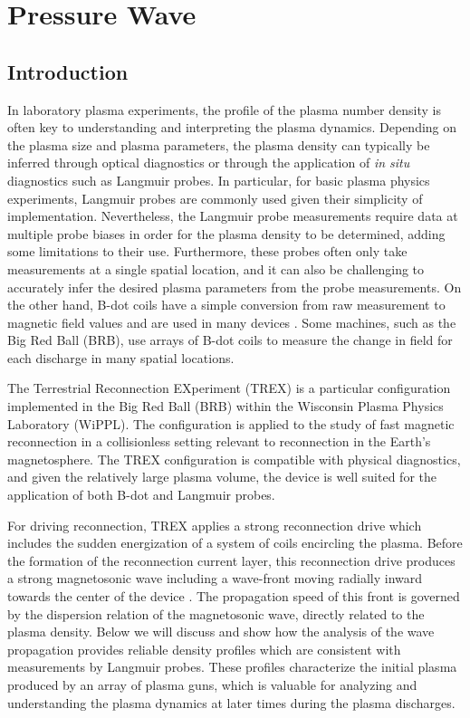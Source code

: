 \chapter{Pressure Wave}
\label{sch:pressure_wave}

\section{Introduction}

In laboratory plasma experiments, the profile of the plasma number density is often key to understanding and interpreting the plasma dynamics. Depending on the plasma size and plasma parameters, the plasma density  can typically be inferred through optical diagnostics or through the application of \textit{in situ} diagnostics such as Langmuir probes. In particular, for basic plasma physics experiments, Langmuir probes are commonly used given their simplicity of implementation. Nevertheless, the Langmuir probe measurements require data at multiple probe biases in order for the plasma density to be determined, adding some limitations to their use.  
Furthermore, these probes often only take measurements at a single spatial location, and it can also be challenging to accurately  infer the desired plasma parameters from the probe measurements.
On the other hand, B-dot coils have a simple  conversion from raw measurement to magnetic field values and are used in many devices \cite{Gekelman_Pribyl_Lucky_Drandell_Leneman_Maggs_Vincena_Van_Compernolle_Tripathi_Morales_et_al_2016} \cite{Olson_2020}. Some machines, such as the Big Red Ball (BRB), use arrays of B-dot coils to measure the change in field for each discharge in many spatial locations.

The Terrestrial Reconnection EXperiment (TREX) is a particular configuration implemented in the Big Red Ball (BRB) within the Wisconsin Plasma Physics Laboratory (WiPPL). The configuration is applied to the study of fast magnetic reconnection in a collisionless setting relevant to reconnection in the Earth's magnetosphere. 
The TREX configuration is compatible with  physical diagnostics, and given the relatively large plasma volume, the device is well suited for  the application of both B-dot and Langmuir probes. 

For driving reconnection, TREX applies a strong reconnection drive which includes the sudden energization of a system of coils encircling the plasma. Before the formation of the reconnection current layer, this reconnection drive produces a strong magnetosonic wave including a wave-front moving radially inward towards the center of the device \cite{Olson_Egedal_Clark_Endrizzi_Greess_Millet-Ayala_Myers_Peterson_Wallace_Forest_2021}. The propagation speed of this front is governed by the dispersion relation of the magnetosonic wave, directly related to the plasma density. Below we will discuss and show how the analysis of the wave propagation provides reliable density profiles which are consistent with measurements by Langmuir probes. These profiles characterize the initial plasma produced by an array of plasma guns, which is valuable for analyzing and understanding the plasma dynamics at later times during the plasma discharges.

